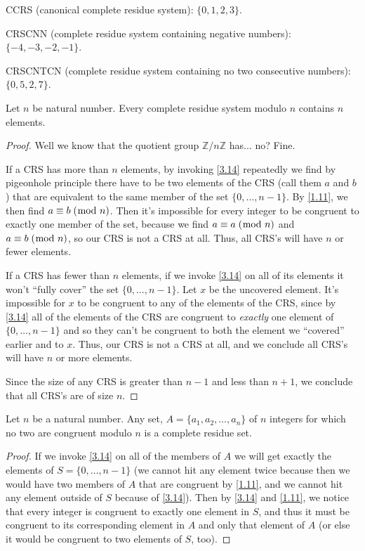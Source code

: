 \documentclass[../main.tex]{subfiles}
\begin{document}
CCRS (canonical complete residue system): $\{0, 1, 2, 3\}$.

CRSCNN (complete residue system containing negative numbers): $\{-4, -3, -2, -1\}$.

CRSCNTCN (complete residue system containing no two consecutive numbers): $\{0, 5, 2, 7\}$.



\pagebreak



\begin{thm} \label{3.16}
  Let $n$ be natural number. Every complete residue system modulo $n$ contains $n$ elements.
\end{thm}

\begin{proof}
  Well we know that the quotient group $\mathbb{Z} / n\mathbb{Z}$ has... no? Fine.

  If a CRS has more than $n$ elements, by invoking \ref{3.14} repeatedly we find by pigeonhole principle there have to be two elements of the CRS (call them $a$ and $b$) that are equivalent to the same member of the set $\{0, \ldots, n-1\}$. By \ref{1.11}, we then find $a \equiv b \; (\bmod \; n)$. Then it's impossible for every integer to be congruent to exactly one member of the set, because we find $a \equiv a \; (\bmod \; n)$ and $a \equiv b \; (\bmod \; n)$, so our CRS is not a CRS at all. Thus, all CRS's will have $n$ or fewer elements.

  If a CRS has fewer than $n$ elements, if we invoke \ref{3.14} on all of its elements it won't ``fully cover'' the set $\{0, \ldots, n-1\}$. Let $x$ be the uncovered element. It's impossible for $x$ to be congruent to any of the elements of the CRS, since by \ref{3.14} all of the elements of the CRS are congruent to \emph{exactly} one element of $\{0, \ldots, n-1\}$ and so they can't be congruent to both the element we ``covered'' earlier and to $x$. Thus, our CRS is not a CRS at all, and we conclude all CRS's will have $n$ or more elements.

  Since the size of any CRS is greater than $n-1$ and less than $n+1$, we conclude that all CRS's are of size $n$.
\end{proof}



\begin{thm} \label{3.17}
  Let $n$ be a natural number. Any set, $A = \{a_1, a_2, \ldots, a_n\}$ of $n$ integers for which no two are congruent modulo $n$ is a complete residue set.
\end{thm}

\begin{proof}
  If we invoke \ref{3.14} on all of the members of $A$ we will get exactly the elements of $S = \{0, \ldots, n-1\}$ (we cannot hit any element twice because then we would have two members of $A$ that are congruent by \ref{1.11}, and we cannot hit any element outside of $S$ because of \ref{3.14}). Then by \ref{3.14} and \ref{1.11}, we notice that every integer is congruent to exactly one element in $S$, and thus it must be congruent to its corresponding element in $A$ and only that element of $A$ (or else it would be congruent to two elements of $S$, too).
\end{proof}
\end{document}
